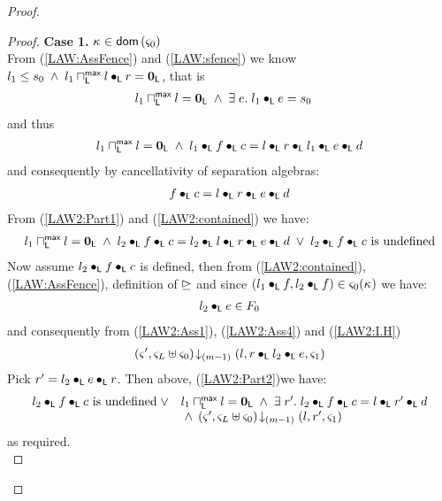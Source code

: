 \begin{lemma}[]
\begin{proof}
\begin{proof}
\noindent\textbf{Case 1. }$\kappa_{} \in \textsf{dom}\left( \varsigma_{0} \right)$\\
From (\ref{LAW:AssFence}) and (\ref{LAW:sfence}) we know $l_1 \leq s_0 \;\land\; l_1 \sqcap_{\textsf{L}}^{\textsf{max}} l \bullet_{\textsf{L}} r = \mathbf{0}_{\textsf{L}}$, that is 
%
\begin{align}
	& l_1 \sqcap_{\textsf{L}}^{\textsf{max}} l = \mathbf{0}_{\textsf{L}} \;\land\; \exists\; e.\; l_1 \bullet_{\textsf{L}} e = s_0 \label{LAW2:contained}
\end{align}
%
and thus
%
\begin{align}
	l_1 \sqcap_{\textsf{L}}^{\textsf{max}} l = \mathbf{0}_{\textsf{L}} \;\land\;  l_1 \bullet_{\textsf{L}} f \bullet_{\textsf{L}} c = l \bullet_{\textsf{L}}  r \bullet_{\textsf{L}} l_1 \bullet_{\textsf{L}} e \bullet_{\textsf{L}} d \nonumber
\end{align}
%
and consequently by cancellativity of separation algebras:
%
\begin{align}
	f \bullet_{\textsf{L}} c = l \bullet_{\textsf{L}} r \bullet_{\textsf{L}} e \bullet_{\textsf{L}} d \label{LAW2:Part1}
\end{align}
%
From (\ref{LAW2:Part1}) and (\ref{LAW2:contained}) we have:
%
\begin{align}
	l_1 \sqcap_{\textsf{L}}^{\textsf{max}} l = \mathbf{0}_{\textsf{L}} \;\land\;  l_2 \bullet_{\textsf{L}} f \bullet_{\textsf{L}} c = l_2 \bullet_{\textsf{L}} l \bullet_{\textsf{L}} r \bullet_{\textsf{L}} e \bullet_{\textsf{L}} d \;\lor\; l_2 \bullet_{\textsf{L}} f \bullet_{\textsf{L}} c \text{ is undefined} \label{LAW2:Part2}
\end{align}
%
Now assume $l_2 \bullet_{\textsf{L}} f \bullet_{\textsf{L}} c$ is defined, then from (\ref{LAW2:contained}), (\ref{LAW:AssFence}), definition of $\unrhd$ and since $(l_1 \bullet_{\textsf{L}} f, l_2 \bullet_{\textsf{L}} f) \in \varsigma_{0}(\kappa_{})$ we have:
%
\begin{align}
	l_2 \bullet_{\textsf{L}} e \in F_0 \label{LAW2:fenced}
\end{align}
%
and consequently from (\ref{LAW2:Ass1}), (\ref{LAW2:Ass4}) and (\ref{LAW2:I.H})
%
\begin{align}
	\left(\varsigma_{}', \varsigma_{L} \uplus \varsigma_{0}\right) \!\downarrow_{(m-1)} \left(l, r \bullet_{\textsf{L}} l_2 \bullet_{\textsf{L}} e, \varsigma_{1}\right)
\end{align}
Pick $r' = l_2 \bullet_{\textsf{L}} e \bullet_{\textsf{L}} r$. Then above, (\ref{LAW2:Part2})we have:
%
\begin{align}
\begin{array}{l l}
	l_2 \bullet_{\textsf{L}} f \bullet_{\textsf{L}} c \text{ is undefined} \;\lor & l_1 \sqcap_{\textsf{L}}^{\textsf{max}} l = \mathbf{0}_{\textsf{L}} \;\land\; \exists\; r'.\; l_2 \bullet_{\textsf{L}} f \bullet_{\textsf{L}} c = l \bullet_{\textsf{L}} r' \bullet_{\textsf{L}} d\\
	& \hspace*{0.1cm}\land\; \left(\varsigma_{}', \varsigma_{L} \uplus \varsigma_{0}\right) \!\downarrow_{(m-1)} \left(l, r', \varsigma_{1}\right)
\end{array} \nonumber
\end{align}
%
as required.\\


\end{proof}
\end{proof}
\end{lemma}
